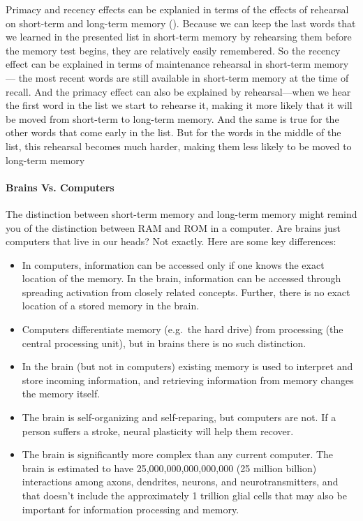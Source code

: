 \documentclass[
]{krantz}
\providecommand{\tightlist}{%
  \setlength{\itemsep}{0pt}\setlength{\parskip}{0pt}}
\begin{document}
Primacy and recency effects can be explanied in terms of the effects of rehearsal on short-term and long-term memory (). Because we can keep the last words that we learned in the presented list in short-term memory by rehearsing them before the memory test begins, they are relatively easily remembered. So the recency effect can be explained in terms of maintenance rehearsal in short-term memory--- the most recent words are still available in short-term memory at the time of recall. And the primacy effect can also be explained by rehearsal---when we hear the first word in the list we start to rehearse it, making it more likely that it will be moved from short-term to long-term memory. And the same is true for the other words that come early in the list. But for the words in the middle of the list, this rehearsal becomes much harder, making them less likely to be moved to long-term memory

\paragraph*{Brains Vs. Computers}\label{brains-vs.-computers}

The distinction between short-term memory and long-term memory might remind you of the distinction between RAM and ROM in a computer. Are brains just computers that live in our heads? Not exactly. Here are some key differences:

\begin{itemize}
\tightlist
\item
  In computers, information can be accessed only if one knows the exact location of the memory. In the brain, information can be accessed through spreading activation from closely related concepts. Further, there is no exact location of a stored memory in the brain.
\item
  Computers differentiate memory (e.g.~the hard drive) from processing (the central processing unit), but in brains there is no such distinction.
\item
  In the brain (but not in computers) existing memory is used to interpret and store incoming information, and retrieving information from memory changes the memory itself.
\item
  The brain is self-organizing and self-reparing, but computers are not. If a person suffers a stroke, neural plasticity will help them recover.
\item
  The brain is significantly more complex than any current computer. The brain is estimated to have 25,000,000,000,000,000 (25 million billion) interactions among axons, dendrites, neurons, and neurotransmitters, and that doesn't include the approximately 1 trillion glial cells that may also be important for information processing and memory.
\end{itemize}
\end{document}
